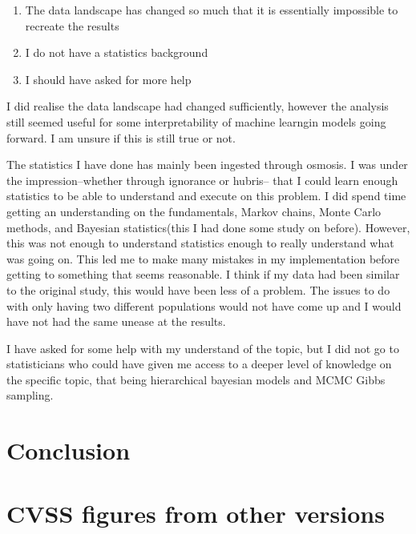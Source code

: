 \documentclass[12pt]{article}
\begin{document}
\begin{enumerate}
	\item The data landscape has changed so much that it is essentially impossible to recreate the
	      results
	\item I do not have a statistics background
	\item I should have asked for more help
\end{enumerate}

I did realise the data landscape had changed sufficiently, however the analysis still seemed useful
for some interpretability of machine learngin models going forward. I am unsure if this is still
true or not.

The statistics I have done has mainly been ingested through osmosis. I was under the
impression--whether through ignorance or hubris-- that I could learn enough statistics to be able to
understand and execute on this problem. I did spend time getting an understanding on the
fundamentals, Markov chains, Monte Carlo methods, and Bayesian statistics(this I had done some study
on before). However, this was not enough to understand statistics enough to really understand what
was going on. This led me to make many mistakes in my implementation before getting to something
that seems reasonable. I think if my data had been similar to the original study, this would have
been less of a problem. The issues to do with only having two different populations would not have
come up and I would have not had the same unease at the results.

I have asked for some help with my understand of the topic, but I did not go to statisticians who
could have given me access to a deeper level of knowledge on the specific topic, that being
hierarchical bayesian models and MCMC Gibbs sampling.

\section{Conclusion}

\printbibliography[title={References}]



\appendix

\renewcommand{\thesection}{Appendix \Alph{section}}

\section{CVSS figures from other versions}
\end{document}
